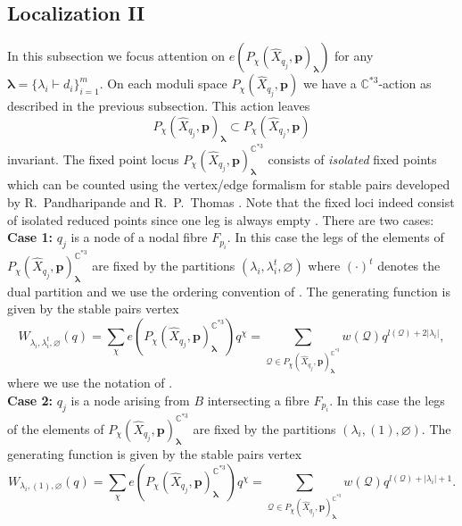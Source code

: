 \documentclass[12pt]{amsart}
\theoremstyle{definition}
\theoremstyle{property}
\newcommand\p{\mathbf{p}}
\newcommand\bslambda{\boldsymbol{\lambda}}
\newcommand\C{\mathbb C}
\newcommand\cQ{\mathcal Q}
\renewcommand\_{^{}_}
\begin{document}
\subsection{Localization II}

In this subsection we focus attention on $e(P_{\chi}(\widehat{X}_{q_j},\p)_{\bslambda})$ for any $\bslambda = \{\lambda_i \vdash d_i\}_{i=1}^{m}$. On each moduli space $P_{\chi}(\widehat{X}_{q_j},\p)$ we have a $\C^{*3}$-action as described in the previous subsection. This action leaves 
$$
P_{\chi}(\widehat{X}_{q_j},\p)_{\bslambda} \subset P_{\chi}(\widehat{X}_{q_j},\p)
$$
invariant. The fixed point locus $P_{\chi}(\widehat{X}_{q_j},\p)_{\bslambda}^{\C^{*3}}$ consists of \emph{isolated} fixed points which can be counted using the vertex/edge formalism for stable pairs developed by R.~Pandharipande and R.~P.~Thomas \cite{PT2}. Note that the fixed loci indeed consist of isolated reduced points since one leg is always empty \cite{PT2}. There are two cases: \\

\noindent \textbf{Case 1:} $q_j$ is a node of a nodal fibre $F_{p_i}$. In this case the legs of the elements of $P_{\chi}(\widehat{X}_{q_j},\p)_{\bslambda}^{\C^{*3}}$ are fixed by the partitions $(\lambda_i, \lambda_{i}^{t}, \varnothing)$ where $(\cdot)^{t}$ denotes the dual partition and we use the ordering convention of \cite{ORV}. The generating function is given by the stable pairs vertex
\begin{equation} \label{formalgenfun1}
W_{\lambda_i, \lambda_{i}^{t}, \varnothing}(q) = \sum_{\chi} e(P_{\chi}(\widehat{X}_{q_j},\p)_{\bslambda}^{\C^{*3}}) q^{\chi} =  \sum_{ \cQ \in P_{\chi}(\widehat{X}_{q_j},\p)_{\bslambda}^{\C^{*3}}} w(\cQ) q^{l(\cQ) + 2 |\lambda_i|},
\end{equation}
where we use the notation of \cite{PT2}. \\

\noindent \textbf{Case 2:} $q_j$ is a node arising from $B$ intersecting a fibre $F_{p_i}$. In this case the legs of the elements of $P_{\chi}(\widehat{X}_{q_j},\p)_{\bslambda}^{\C^{*3}}$ are fixed by the partitions $(\lambda_i, (1), \varnothing)$. The generating function is given by the stable pairs vertex
\begin{equation} \label{formalgenfun2}
W_{\lambda_i, (1), \varnothing}(q) = \sum_{\chi} e(P_{\chi}(\widehat{X}_{q_j},\p)_{\bslambda}^{\C^{*3}}) q^{\chi} = \sum_{ \cQ \in P_{\chi}(\widehat{X}_{q_j},\p)_{\bslambda}^{\C^{*3}}} w(\cQ) q^{l(\cQ) + |\lambda_i| + 1}.
\end{equation}
\end{document}
